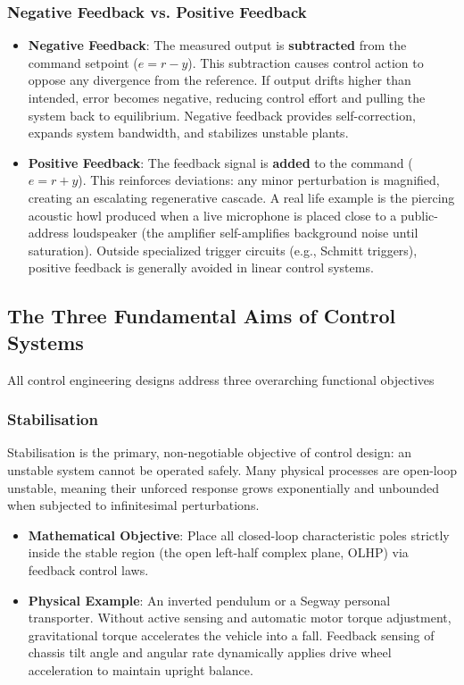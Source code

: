 \documentclass[12pt,onecolumn,twoside ]{article}
\begin{document}
	\subsubsection{Negative Feedback vs. Positive Feedback}
	\begin{itemize}
		\item
		\textbf{Negative Feedback}: The measured output is \textbf{subtracted} from the command setpoint ($e = r - y$). This subtraction causes control action to oppose any divergence from the reference. If output drifts higher than intended, error becomes negative, reducing control effort and pulling the system back to equilibrium. Negative feedback provides self-correction, expands system bandwidth, and stabilizes unstable plants.
		\item
		\textbf{Positive Feedback}: The feedback signal is \textbf{added} to the command ($e = r + y$). This reinforces deviations: any minor perturbation is magnified, creating an escalating regenerative cascade. A real life example is the piercing acoustic howl produced when a live microphone is placed close to a public-address loudspeaker (the amplifier self-amplifies background noise until saturation). Outside specialized trigger circuits (e.g., Schmitt triggers), positive feedback is generally avoided in linear control systems.
	\end{itemize}
	
	\subsection{The Three Fundamental Aims of Control Systems}
	All control engineering designs address three overarching functional objectives
	\subsubsection{Stabilisation}
	Stabilisation is the primary, non-negotiable objective of control design: an unstable system cannot be operated safely. Many physical processes are open-loop unstable, meaning their unforced response grows exponentially and unbounded when subjected to infinitesimal perturbations.
	\begin{itemize}
		\item
		\textbf{Mathematical Objective}: Place all closed-loop characteristic poles strictly inside the stable region (the open left-half complex plane, OLHP) via feedback control laws.
		\item
		\textbf{Physical Example}: An inverted pendulum or a Segway personal transporter. Without active sensing and automatic motor torque adjustment, gravitational torque accelerates the vehicle into a fall. Feedback sensing of chassis tilt angle and angular rate dynamically applies drive wheel acceleration to maintain upright balance.
	\end{itemize}
\end{document}
